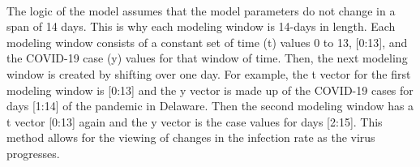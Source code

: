 \documentclass[12pt]{article}
\begin{document}
\paragraph{} The logic of the model assumes that the model parameters do not change in a span of 14 days. This is why each modeling window is 14-days in length. Each modeling window consists of a constant set of time (t) values 0 to 13, [0:13], and the COVID-19 case (y) values for that window of time. Then, the next modeling window is created by shifting over one day. For example, the t vector for the first modeling window is [0:13] and the y vector is made up of the COVID-19 cases for days [1:14] of the pandemic in Delaware. Then the second modeling window has a t vector [0:13] again and the y vector is the case values for days [2:15]. This method allows for the viewing of changes in the infection rate as the virus progresses.
\end{document}
